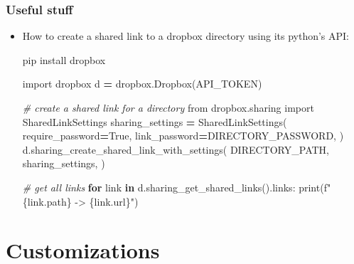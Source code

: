 \documentclass[
]{book}
\newenvironment{Shaded}{\begin{snugshade}}{\end{snugshade}}
\newcommand{\BuiltInTok}[1]{#1}
\newcommand{\CommentTok}[1]{\textcolor[rgb]{0.56,0.35,0.01}{\textit{#1}}}
\newcommand{\ControlFlowTok}[1]{\textcolor[rgb]{0.13,0.29,0.53}{\textbf{#1}}}
\newcommand{\ExtensionTok}[1]{#1}
\newcommand{\ImportTok}[1]{#1}
\newcommand{\KeywordTok}[1]{\textcolor[rgb]{0.13,0.29,0.53}{\textbf{#1}}}
\newcommand{\NormalTok}[1]{#1}
\newcommand{\OperatorTok}[1]{\textcolor[rgb]{0.81,0.36,0.00}{\textbf{#1}}}
\newcommand{\SpecialCharTok}[1]{\textcolor[rgb]{0.00,0.00,0.00}{#1}}
\newcommand{\SpecialStringTok}[1]{\textcolor[rgb]{0.31,0.60,0.02}{#1}}
\newcommand{\VariableTok}[1]{\textcolor[rgb]{0.00,0.00,0.00}{#1}}
\begin{document}
\hypertarget{useful-stuff}{%
\subsection*{Useful stuff}\label{useful-stuff}}

\begin{itemize}
\item
  How to create a shared link to a dropbox directory using its python's API:

\begin{Shaded}
\begin{Highlighting}[]
\ExtensionTok{pip}\NormalTok{ install dropbox}
\end{Highlighting}
\end{Shaded}

\begin{Shaded}
\begin{Highlighting}[]
\ImportTok{import}\NormalTok{ dropbox}
\NormalTok{d }\OperatorTok{=}\NormalTok{ dropbox.Dropbox(API\_TOKEN)}

\CommentTok{\# create a shared link for a directory}
\ImportTok{from}\NormalTok{ dropbox.sharing }\ImportTok{import}\NormalTok{ SharedLinkSettings}
\NormalTok{sharing\_settings }\OperatorTok{=}\NormalTok{ SharedLinkSettings(}
\NormalTok{    require\_password}\OperatorTok{=}\VariableTok{True}\NormalTok{,}
\NormalTok{    link\_password}\OperatorTok{=}\NormalTok{DIRECTORY\_PASSWORD,}
\NormalTok{)}
\NormalTok{d.sharing\_create\_shared\_link\_with\_settings(}
\NormalTok{    DIRECTORY\_PATH,}
\NormalTok{    sharing\_settings,}
\NormalTok{)}

\CommentTok{\# get all links}
\ControlFlowTok{for}\NormalTok{ link }\KeywordTok{in}\NormalTok{ d.sharing\_get\_shared\_links().links:}
    \BuiltInTok{print}\NormalTok{(}\SpecialStringTok{f"}\SpecialCharTok{\{}\NormalTok{link}\SpecialCharTok{.}\NormalTok{path}\SpecialCharTok{\}}\SpecialStringTok{ {-}\textgreater{} }\SpecialCharTok{\{}\NormalTok{link}\SpecialCharTok{.}\NormalTok{url}\SpecialCharTok{\}}\SpecialStringTok{"}\NormalTok{)}
\end{Highlighting}
\end{Shaded}
\end{itemize}

\hypertarget{customizations}{%
\chapter{Customizations}\label{customizations}}
\end{document}
